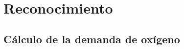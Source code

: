 %


\section{Reconocimiento}\label{sec:ReconocimientoSVM}



%


\subsection{Cálculo de la demanda de oxígeno} \label{secc:calculoDemandaOxigeno}


